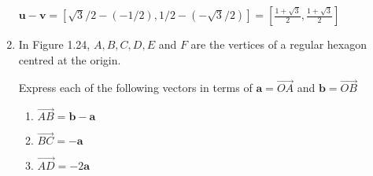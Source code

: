 \documentclass{article}
\begin{document}
\begin{enumerate}
		$\boldsymbol{u} - \boldsymbol{v} = [\sqrt{3}/2 - (-1/2), 1/2 - (-\sqrt{3}/2 )] = [\frac{1+\sqrt{3}}{2}, \frac{1+\sqrt{3}}{2}]$

		\item In Figure 1.24, $A,B,C,D,E$ and $F$ are the vertices of a regular hexagon centred at the origin.

			Express each of the following vectors in terms of $\boldsymbol{a} = \vec{OA}$ and $\boldsymbol{b} = \vec{OB}$

		\begin{enumerate}

			\item $\vec{AB} = \boldsymbol{b}-\boldsymbol{a}$

			\item $\vec{BC} = -\boldsymbol{a}$

			\item $\vec{AD} = -2\boldsymbol{a}$
		\end{enumerate}



\end{enumerate}
\end{document}
